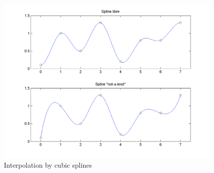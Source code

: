 \begin{exo}
\begin{figure}[ht] 
    \begin{center}
    \includegraphics[scale=0.55]{images/spline-cubique}
    \end{center}
    \caption{Interpolation by cubic splines}
              \label{fig-spline-cubic}
\end{figure}
\end{exo}
